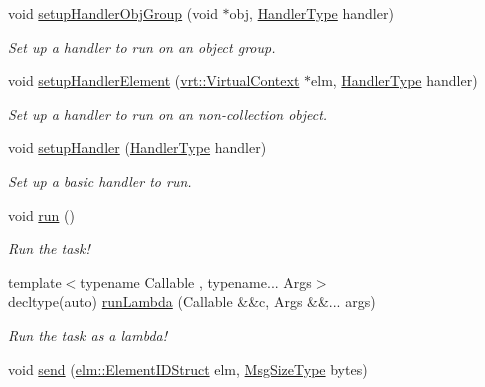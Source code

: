 \begin{DoxyCompactItemize}
void \hyperlink{structvt_1_1runnable_1_1_runnable_new_abad781e1e7a4a58d00c6c0dd3a44d105}{setup\+Handler\+Obj\+Group} (void $\ast$obj, \hyperlink{namespacevt_af64846b57dfcaf104da3ef6967917573}{Handler\+Type} handler)
\begin{DoxyCompactList}\small\item\em Set up a handler to run on an object group. \end{DoxyCompactList}\item 
void \hyperlink{structvt_1_1runnable_1_1_runnable_new_aeaec7cf81fe97f2d6b57f35dbd408b5e}{setup\+Handler\+Element} (\hyperlink{structvt_1_1vrt_1_1_virtual_context}{vrt\+::\+Virtual\+Context} $\ast$elm, \hyperlink{namespacevt_af64846b57dfcaf104da3ef6967917573}{Handler\+Type} handler)
\begin{DoxyCompactList}\small\item\em Set up a handler to run on an non-\/collection object. \end{DoxyCompactList}\item 
void \hyperlink{structvt_1_1runnable_1_1_runnable_new_ab95b9552fe304366b21421ded2b795dc}{setup\+Handler} (\hyperlink{namespacevt_af64846b57dfcaf104da3ef6967917573}{Handler\+Type} handler)
\begin{DoxyCompactList}\small\item\em Set up a basic handler to run. \end{DoxyCompactList}\item 
void \hyperlink{structvt_1_1runnable_1_1_runnable_new_a3fa6c8ee2214c074c748000f782ad793}{run} ()
\begin{DoxyCompactList}\small\item\em Run the task! \end{DoxyCompactList}\item 
{\footnotesize template$<$typename Callable , typename... Args$>$ }\\decltype(auto) \hyperlink{structvt_1_1runnable_1_1_runnable_new_a9bc943e7d924be528d2a0c02af3850c8}{run\+Lambda} (Callable \&\&c, Args \&\&... args)
\begin{DoxyCompactList}\small\item\em Run the task as a lambda! \end{DoxyCompactList}\item 
void \hyperlink{structvt_1_1runnable_1_1_runnable_new_aa7e06ec59e7376d1d01dfa6ab9a9563b}{send} (\hyperlink{structvt_1_1elm_1_1_element_i_d_struct}{elm\+::\+Element\+I\+D\+Struct} elm, \hyperlink{namespacevt_a408e86a8c7c89309b52907dc5a513924}{Msg\+Size\+Type} bytes)

\end{DoxyCompactItemize}
